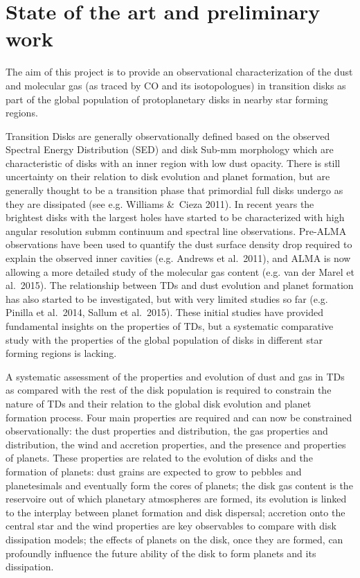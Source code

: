 \documentclass[10pt,fleqn,twoside]{article}
\newcommand{\Tcol}{\color{blue}}
\begin{document}
\section{\Tcol State of the art and preliminary work}
\renewcommand{\leftmark}{\sc State of the Art and preliminary work}

The aim of this project is to provide an observational characterization of the dust and molecular gas
(as traced by CO and its isotopologues) in transition disks as part of the global population of protoplanetary disks in nearby star forming regions.  

Transition Disks are generally observationally defined based on the observed Spectral Energy
Distribution (SED) and disk Sub-mm morphology which are characteristic of disks with an inner region
with low dust opacity. There is still uncertainty on their relation 
to disk evolution and planet formation, but are generally thought to be a transition phase that
primordial full disks undergo as they are dissipated (see e.g. Williams \&\ Cieza 2011). In recent 
years the brightest disks with the largest holes have started to be characterized with high angular resolution submm continuum and spectral line observations. 
Pre-ALMA observations have been used to quantify the dust surface density drop required to 
explain the observed inner cavities (e.g. Andrews et al.~2011), and ALMA is now allowing a more 
detailed study of the molecular gas content (e.g. van der Marel et al.~2015). 
The relationship between TDs and dust evolution and planet formation has also started to be investigated,
but with very limited studies so far (e.g. Pinilla et al.~2014, Sallum et al.~2015).
These initial studies have provided fundamental insights on the properties of TDs, but a 
systematic comparative study with the properties of the global population of disks in different 
star forming regions is lacking.

A systematic assessment of the properties and evolution of dust and gas in TDs as compared with the rest of the disk population is required to constrain the nature of TDs and their relation to the global disk evolution and planet formation process. Four main properties are required and can now be constrained 
observationally: the dust properties and distribution, the gas properties and distribution, the wind and accretion properties, and the presence and properties of planets. These properties are related to the evolution of disks and the formation of planets: dust grains are expected to grow to pebbles and planetesimals and eventually form the cores of planets; the disk gas content is the reservoire out of which planetary atmospheres are formed, its evolution is linked to the interplay between planet formation and disk dispersal; accretion onto the central star and the wind properties are key observables to compare with disk dissipation models; the effects of planets on the disk, once they are formed, can profoundly influence the future ability of the disk to form planets and its dissipation.
\end{document}
